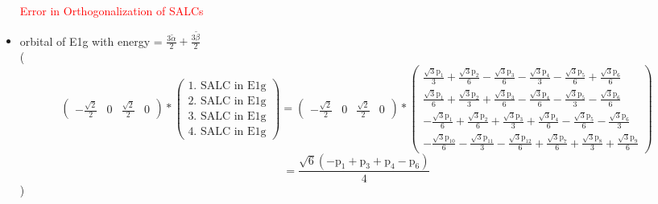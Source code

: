 \documentclass[12pt,a4paper]{article}
\begin{document}
\begin{itemize}
\textcolor{red}{Error in Orthogonalization of SALCs}\item orbital of E1g with energy = 
                                $\frac{3 \tilde{\alpha}}{2} + \frac{3 \tilde{\beta}}{2}$ \\
( 
$$
\begin{pmatrix}- \frac{\sqrt{2}}{2} & 0 & \frac{\sqrt{2}}{2} & 0\end{pmatrix} * \left(\begin{array}{c}\text{1. SALC in E1g} \\ \text{2. SALC in E1g} \\ \text{3. SALC in E1g} \\ \text{4. SALC in E1g}\end{array}\right) = \begin{pmatrix}- \frac{\sqrt{2}}{2} & 0 & \frac{\sqrt{2}}{2} & 0\end{pmatrix} * \begin{pmatrix}\frac{\sqrt{3} \text{p}_{1}}{3} + \frac{\sqrt{3} \text{p}_{2}}{6} - \frac{\sqrt{3} \text{p}_{3}}{6} - \frac{\sqrt{3} \text{p}_{4}}{3} - \frac{\sqrt{3} \text{p}_{5}}{6} + \frac{\sqrt{3} \text{p}_{6}}{6}\\\frac{\sqrt{3} \text{p}_{1}}{6} + \frac{\sqrt{3} \text{p}_{2}}{3} + \frac{\sqrt{3} \text{p}_{3}}{6} - \frac{\sqrt{3} \text{p}_{4}}{6} - \frac{\sqrt{3} \text{p}_{5}}{3} - \frac{\sqrt{3} \text{p}_{6}}{6}\\- \frac{\sqrt{3} \text{p}_{1}}{6} + \frac{\sqrt{3} \text{p}_{2}}{6} + \frac{\sqrt{3} \text{p}_{3}}{3} + \frac{\sqrt{3} \text{p}_{4}}{6} - \frac{\sqrt{3} \text{p}_{5}}{6} - \frac{\sqrt{3} \text{p}_{6}}{3}\\- \frac{\sqrt{3} \text{p}_{10}}{6} - \frac{\sqrt{3} \text{p}_{11}}{3} - \frac{\sqrt{3} \text{p}_{12}}{6} + \frac{\sqrt{3} \text{p}_{7}}{6} + \frac{\sqrt{3} \text{p}_{8}}{3} + \frac{\sqrt{3} \text{p}_{9}}{6}\end{pmatrix} 
 $$ $$ = \frac{\sqrt{6} \left(- \text{p}_{1} + \text{p}_{3} + \text{p}_{4} - \text{p}_{6}\right)}{4} 
 $$ 
 )


\end{itemize}
\end{document}
